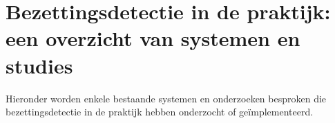 


\section{Bezettingsdetectie in de praktijk: een overzicht van systemen en studies}
Hieronder worden enkele bestaande systemen en onderzoeken besproken die bezettingsdetectie in de praktijk hebben onderzocht of geïmplementeerd.


